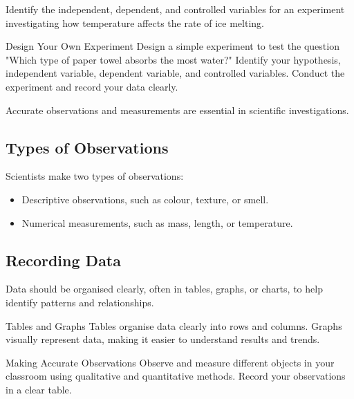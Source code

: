 \begin{stopandthink}
Identify the independent, dependent, and controlled variables for an experiment investigating how temperature affects the rate of ice melting.
\end{stopandthink}

\begin{investigation}{Design Your Own Experiment}
Design a simple experiment to test the question "Which type of paper towel absorbs the most water?" Identify your hypothesis, independent variable, dependent variable, and controlled variables. Conduct the experiment and record your data clearly.
\end{investigation}

\FloatBarrier
\1

Accurate observations and measurements are essential in scientific investigations.

\subsection{Types of Observations}

Scientists make two types of observations:

\begin{itemize}
    \item {} Descriptive observations, such as colour, texture, or smell.
    \item {} Numerical measurements, such as mass, length, or temperature.
\end{itemize}

\subsection{Recording Data}

Data should be organised clearly, often in tables, graphs, or charts, to help identify patterns and relationships.

\begin{keyconcept}{Tables and Graphs}
Tables organise data clearly into rows and columns. Graphs visually represent data, making it easier to understand results and trends.
\end{keyconcept}

\begin{investigation}{Making Accurate Observations}
Observe and measure different objects in your classroom using qualitative and quantitative methods. Record your observations in a clear table.
\end{investigation}

